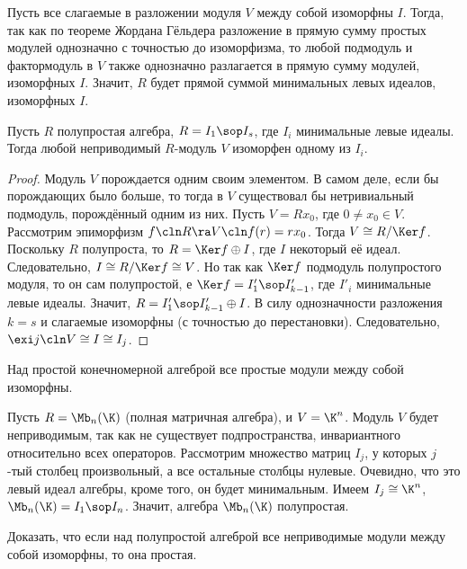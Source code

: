 \documentclass[a4paper]{article}
\begin{document}
\begin{note}
Пусть все слагаемые в разложении модуля $V$ между собой изоморфны $I$. Тогда, так как по теореме
Жордана Гёльдера разложение в прямую сумму простых модулей однозначно с точностью до изоморфизма, то любой
подмодуль и фактормодуль в $V$ также однозначно разлагается в прямую сумму модулей, изоморфных $I$. Значит,
$R$ будет прямой суммой минимальных левых идеалов, изоморфных $I$.
\end{note}

\begin{stm}
Пусть $R$ полупростая алгебра, $R= I_1 \sop I_s$, где $I_i$ минимальные левые идеалы. Тогда  любой
неприводимый $R$-модуль $V$ изоморфен одному из $I_i$.
\end{stm}
\begin{proof}
Модуль $V$ порождается одним своим элементом. В самом деле, если бы порождающих было больше, то  тогда в $V$
существовал бы нетривиальный подмодуль, порождённый одним из них. Пусть $V=Rx_0$, где $0\neq x_0 \in V$.
Рассмотрим эпиморфизм $f\cln R \ra V\cln f(r)=rx_0$. Тогда $V \cong R/\Ker f$. Поскольку $R$ полупроста, то $R =
\Ker f \oplus I$, где $I$ некоторый её идеал. Следовательно, $I \cong R/\Ker f \cong V$. Но так как $\Ker
f$ подмодуль полупростого модуля, то он сам полупростой, е $\Ker f = I'_1 \sop I'_{k-1}$, где
$I'_i$ минимальные левые идеалы. Значит, $R=I'_1 \sop I'_{k-1} \oplus I$. В силу однозначности разложения
$k=s$ и слагаемые изоморфны (с точностью до перестановки). Следовательно, $\exi j\cln V \cong I \cong I_j$.
\end{proof}

\begin{imp}
Над простой конечномерной алгеброй все простые модули между собой изоморфны.
\end{imp}

\begin{ex}
Пусть $R=\Mb_n(\K)$ (полная матричная алгебра), и $V=\K^n$. Модуль $V$ будет неприводимым, так как  не
существует подпространства, инвариантного относительно всех операторов. Рассмотрим множество матриц $I_j$, у
которых $j$-тый столбец произвольный, а все остальные столбцы нулевые. Очевидно, что это левый идеал
алгебры, кроме того, он будет минимальным. Имеем $I_j \cong \K^n$, $\Mb_n(\K) = I_1 \sop I_n$. Значит,
алгебра $\Mb_n(\K)$ полупростая.
\end{ex}

\begin{problem}
Доказать, что если над полупростой алгеброй все неприводимые модули между собой изоморфны, то она простая.
\end{problem}
\end{document}
